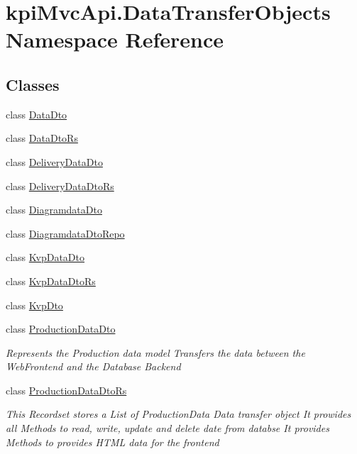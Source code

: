 \hypertarget{namespacekpi_mvc_api_1_1_data_transfer_objects}{}\section{kpi\+Mvc\+Api.\+Data\+Transfer\+Objects Namespace Reference}
\label{namespacekpi_mvc_api_1_1_data_transfer_objects}
\subsection*{Classes}
\begin{DoxyCompactItemize}
\item 
class \hyperlink{classkpi_mvc_api_1_1_data_transfer_objects_1_1_data_dto}{Data\+Dto}
\item 
class \hyperlink{classkpi_mvc_api_1_1_data_transfer_objects_1_1_data_dto_rs}{Data\+Dto\+Rs}
\item 
class \hyperlink{classkpi_mvc_api_1_1_data_transfer_objects_1_1_delivery_data_dto}{Delivery\+Data\+Dto}
\item 
class \hyperlink{classkpi_mvc_api_1_1_data_transfer_objects_1_1_delivery_data_dto_rs}{Delivery\+Data\+Dto\+Rs}
\item 
class \hyperlink{classkpi_mvc_api_1_1_data_transfer_objects_1_1_diagramdata_dto}{Diagramdata\+Dto}
\item 
class \hyperlink{classkpi_mvc_api_1_1_data_transfer_objects_1_1_diagramdata_dto_repo}{Diagramdata\+Dto\+Repo}
\item 
class \hyperlink{classkpi_mvc_api_1_1_data_transfer_objects_1_1_kvp_data_dto}{Kvp\+Data\+Dto}
\item 
class \hyperlink{classkpi_mvc_api_1_1_data_transfer_objects_1_1_kvp_data_dto_rs}{Kvp\+Data\+Dto\+Rs}
\item 
class \hyperlink{classkpi_mvc_api_1_1_data_transfer_objects_1_1_kvp_dto}{Kvp\+Dto}
\item 
class \hyperlink{classkpi_mvc_api_1_1_data_transfer_objects_1_1_production_data_dto}{Production\+Data\+Dto}
\begin{DoxyCompactList}\small\item\em Represents the Production data model Transfers the data between the Web\+Frontend and the Database Backend \end{DoxyCompactList}\item 
class \hyperlink{classkpi_mvc_api_1_1_data_transfer_objects_1_1_production_data_dto_rs}{Production\+Data\+Dto\+Rs}
\begin{DoxyCompactList}\small\item\em This Recordset stores a List of Production\+Data Data transfer object It prowides all Methods to read, write, update and delete date from databse It provides Methods to provides H\+T\+ML data for the frontend \end{DoxyCompactList}\end{DoxyCompactItemize}

